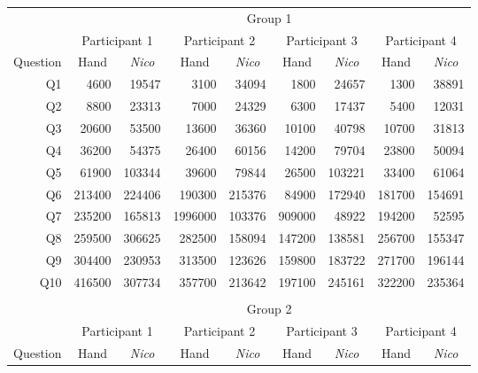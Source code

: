 \documentclass[12pt,twoside,notitlepage,xetex]{report}
\begin{document}
\begin{center}
\begin{table}[H]
\begin{center}
\begin{tabular}{|r||r|r||r|r||r|r||r|r|}
\cline{2-9}
\multicolumn{1}{c|}{} & \multicolumn{8}{c|}{Group 1}\\ \cline{2-9}
\multicolumn{1}{c|}{} & \multicolumn{2}{c||}{Participant 1} & \multicolumn{2}{c||}{Participant 2} & \multicolumn{2}{c||}{Participant 3} & \multicolumn{2}{c|}{Participant 4}\\ \hline
\multicolumn{1}{|c||}{Question} & \multicolumn{1}{c|}{Hand} & \multicolumn{1}{c||}{\emph{Nico}} & \multicolumn{1}{c|}{Hand} & \multicolumn{1}{c||}{\emph{Nico}} & \multicolumn{1}{c|}{Hand} & \multicolumn{1}{c||}{\emph{Nico}} & \multicolumn{1}{c|}{Hand} & \multicolumn{1}{c|}{\emph{Nico}}\\ \hline \hline
Q1 & 4600 & 19547 & 3100 & 34094 & 1800 & 24657 & 1300 & 38891\\ \hline
Q2 & 8800 & 23313 & 7000 & 24329 & 6300 & 17437 & 5400 & 12031\\ \hline
Q3 & 20600 & 53500 & 13600 & 36360 & 10100 & 40798 & 10700 & 31813\\ \hline
Q4 & 36200 & 54375 & 26400 & 60156 & 14200 & 79704 & 23800 & 50094\\ \hline
Q5 & 61900 & 103344 & 39600 & 79844 & 26500 & 103221 & 33400 & 61064\\ \hline
Q6 & 213400 & 224406 & 190300 & 215376 & 84900 & 172940 & 181700 & 154691\\ \hline
Q7 & 235200 & 165813 & 1996000 & 103376 & 909000 & 48922 & 194200 & 52595\\ \hline
Q8 & 259500 & 306625 & 282500 & 158094 & 147200 & 138581 & 256700 & 155347\\ \hline
Q9 & 304400 & 230953 & 313500 & 123626 & 159800 & 183722 & 271700 & 196144\\ \hline
Q10 & 416500 & 307734 & 357700 & 213642 & 197100 & 245161 & 322200 & 235364\\ \hline
\multicolumn{9}{c}{}\\ \cline{2-9}
\multicolumn{1}{c|}{} & \multicolumn{8}{c|}{Group 2}\\ \cline{2-9}
\multicolumn{1}{c|}{} & \multicolumn{2}{c||}{Participant 1} & \multicolumn{2}{c||}{Participant 2} & \multicolumn{2}{c||}{Participant 3} & \multicolumn{2}{c|}{Participant 4}\\ \hline
\multicolumn{1}{|c||}{Question} & \multicolumn{1}{c|}{Hand} & \multicolumn{1}{c||}{\emph{Nico}} & \multicolumn{1}{c|}{Hand} & \multicolumn{1}{c||}{\emph{Nico}} & \multicolumn{1}{c|}{Hand} & \multicolumn{1}{c||}{\emph{Nico}} & \multicolumn{1}{c|}{Hand} & \multicolumn{1}{c|}{\emph{Nico}}\\ \hline \hline

\end{tabular}
\end{center}
\end{table}
\end{center}
\end{document}
